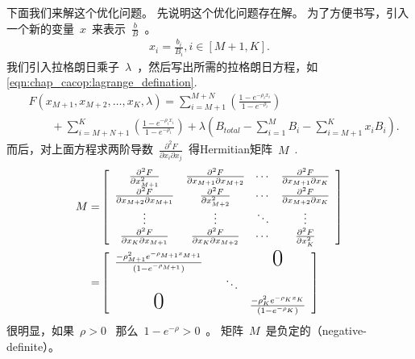 下面我们来解这个优化问题。
先说明这个优化问题存在解。
为了方便书写，引入一个新的变量~$x$~来表示~$\frac{b}{B}$~。
\begin{equation*}
\begin{split}
x_i = \frac{b_i}{B_i} , i \in [M+1, K].
\end{split}
\end{equation*}
我们引入拉格朗日乘子~$\lambda$~，然后写出所需的拉格朗日方程，如
\eqref{eqn:chap_cacop:lagrange_defination}.
\begin{align}
&\displaystyle F(x_{M+1}, x_{M+2}, \dots, x_K, \lambda)= \sum^{M+N}_{i=M+1}
\left( \frac{1-e^{-\rho_i x_i}}{1-e^{-\rho_i}} \right) \nonumber \\
& \qquad \displaystyle +\sum_{i=M+N+1}^K\left( \frac{1-e^{-\rho_i x_i}}{1-e^{-\rho_i}} \right) 
 + \lambda
\left(B_{total} - \sum_{i=1}^M B_i -\sum^K_{i=M+1} x_i B_i \right).
\label{eqn:chap_cacop:lagrange_defination}
\end{align}
而后，对上面方程求两阶导数~$\frac{\partial ^2F}{\partial x_i \partial x_j}$~得Hermitian矩阵~${M}$~.
\begin{eqnarray*}
{M} = & 
\left[
\begin{array}{cccc}
\frac{\partial ^2F}{\partial x_{M+1} ^2} &\frac{\partial ^2F}{\partial x_{M+1} \partial x_{M+2}} & \dotsi & \frac{\partial ^2F}{\partial x_{M+1} \partial x_K} \\
\frac{\partial ^2F}{\partial x_{M+2} \partial x_{M+1}}& \frac{\partial ^2F}{\partial x_{M+2} ^2}& \dotsi & \frac{\partial ^2F}{\partial x_{M+2} \partial x_K}\\
\vdots & \vdots & \ddots & \vdots \\

\frac{\partial ^2F}{\partial x_{K} \partial x_{M+1} } &\frac{\partial ^2F}{\partial x_{K} \partial x_{M+2}} & \dotsi&\frac{\partial ^2F}{\partial x_K ^2}\\
\end{array}
\right] \\
=&
\left[
\begin{array}{cccc}
\frac{-\rho_{M+1}^2 e^{-\rho_{M+1} x_{M+1}}}{(1-e^{-\rho_{M+1}})} & & & \text{{\huge{0}}}\\
&&\ddots\\
\text{{\huge{0}}} &&& \frac{-\rho_{K}^2 e^{-\rho_{K} x_{K}}}{(1-e^{-\rho_{K}})}\\
\end{array}
\right] 
\end{eqnarray*}
很明显，如果~$\rho >0$~ 那么~$1-e^{-\rho} >0$~。
矩阵~${M}$~是负定的（negative-definite）。
